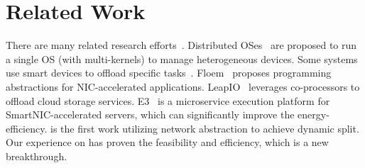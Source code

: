 \section{Related Work}
\label{s:relwk}

There are many related research efforts~\cite{phothilimthana2018floem, seshadri2014willow, gu2016biscuit, baumann2009multikernel, barbalace2015popcorn, gamsa1999tornado, silberstein2013gpufs, kim2014gpunet, silberstein2017omnix, tork2020lynx, brokhman2019gaia, shan2018legoos, Asmussen:2016:MHC:2872362.2872371, nider2021last, pemberton2021restless, 10.1145/3458336.3465273, liu2019offloading, cho2020flick}.
Distributed OSes~\cite{baumann2009multikernel, silberstein2017omnix, barbalace2015popcorn} are proposed to run a single OS (with multi-kernels) to manage heterogeneous devices.
Some systems use smart devices to offload specific tasks~\cite{phothilimthana2018floem, seshadri2014willow, gu2016biscuit, kim2014gpunet, silberstein2013gpufs}.
Floem~\cite{phothilimthana2018floem} proposes programming abstractions for NIC-accelerated applications.
LeapIO~\cite{li2020leapio} leverages co-processors to offload cloud storage services.
E3~\cite{234944} is a microservice execution platform for SmartNIC-accelerated servers, which can significantly improve the energy-efficiency.
\os is the first work utilizing network abstraction to achieve dynamic split.
Our experience on \sys has proven the feasibility and efficiency, which is a new breakthrough.



